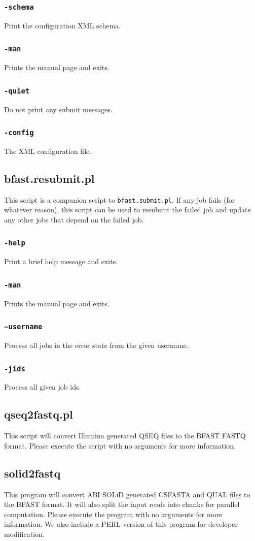 \documentclass[a4paper,12pt]{book}
\newcommand{\TT}[1]{{\tt #1}} %
\begin{document}
\subsubsection{\TT{-schema}}
Print the configuration XML schema.
\subsubsection{\TT{-man}}
Prints the manual page and exits.
\subsubsection{\TT{-quiet}}
Do not print any submit messages.
\subsubsection{\TT{-config}}
The XML configuration file.
\subsection{bfast.resubmit.pl}
This script is a companion script to \TT{bfast.submit.pl}.
If any job fails (for whatever reason), this script can be used to resubmit the failed job and update any other jobs that depend on the failed job.
\subsubsection{\TT{-help}}
Print a brief help message and exits.
\subsubsection{\TT{-man}}
Prints the manual page and exits.
\subsubsection{\TT{−username}}
Process all jobs in the error state from the given username.
\subsubsection{\TT{-jids}}
Process all given job ids.

\subsection{qseq2fastq.pl}
This script will convert Illumina generated QSEQ files to the BFAST FASTQ format.
Please execute the script with no arguments for more information.
\subsection{solid2fastq}
This program will convert ABI SOLiD generated CSFASTA and QUAL files to the BFAST format.
It will also split the input reads into chunks for parallel computation.
Please execute the program with no arguments for more information.
We also include a PERL version of this program for developer modification.
\end{document}
